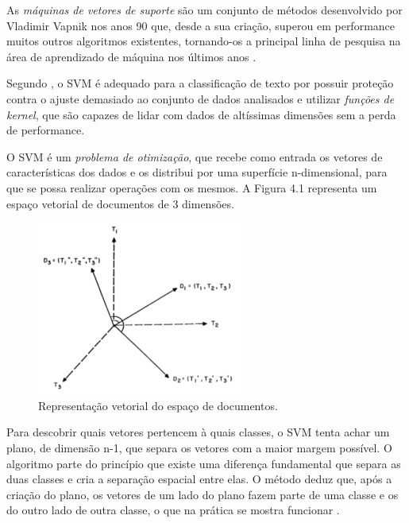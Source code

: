 As \textit{máquinas de vetores de suporte} são um conjunto de métodos desenvolvido por Vladimir Vapnik nos anos 90 que, desde a sua criação, superou em performance muitos outros algoritmos existentes, tornando-os a principal linha de pesquisa na área de aprendizado de máquina nos últimos anos \cite{Grigorik2008}. 

Segundo , o SVM é adequado para a classificação de texto por possuir proteção contra o ajuste demasiado ao conjunto de dados analisados e utilizar \textit{funções de kernel}, que são capazes de lidar com dados de altíssimas dimensões sem a perda de performance.

O SVM é um \textit{problema de otimização}, que recebe como entrada os vetores de características dos dados e os distribui por uma superfície n-dimensional, para que se possa realizar operações com os mesmos. A Figura 4.1 representa um espaço vetorial de documentos de 3 dimensões.

\begin{figure}[htpb]
	\begin{center}
		\includegraphics[width=0.6\textwidth]{figuras/representacao-doc.pdf}
		\caption{Representação vetorial do espaço de documentos. \cite{Salton1975}}
	\end{center}
\end{figure}

Para descobrir quais vetores pertencem à quais classes, o SVM tenta achar um plano, de dimensão n-1, que separa os vetores com a maior margem possível. O algoritmo parte do princípio que existe uma diferença fundamental que separa as duas classes e cria a separação espacial entre elas. O método deduz que, após a criação do plano, os vetores de um lado do plano fazem parte de uma classe e os do outro lado de outra classe, o que na prática se mostra funcionar \cite{Grigorik2008}. 

